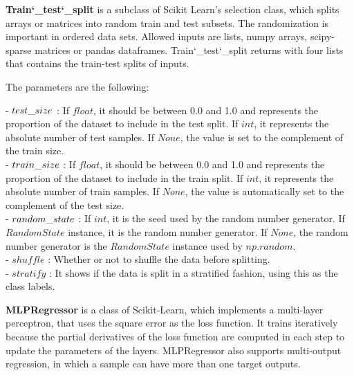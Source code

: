 \textbf{Train\char`_test\char`_split} is a subclass of Scikit Learn's selection class, which splits arrays or matrices into random train and test subsets. The randomization is important in ordered data sets. Allowed inputs are lists, numpy arrays, scipy-sparse matrices or pandas dataframes. Train\char`_test\char`_split returns with four lists that contains the train-test splits of inputs.\medskip

\noindent The parameters are the following:\smallskip

\noindent - $test\char`_size$ : If $float$, it should be between 0.0 and 1.0 and represents the proportion of the dataset to include in the test split. If $int$, it represents the absolute number of test samples. If $None$, the value is set to the complement of the train size. \\
- $train\char`_size$ : If $float$, it should be between 0.0 and 1.0 and represents the proportion of the dataset to include in the train split. If $int$, it represents the absolute number of train samples. If $None$, the value is automatically set to the complement of the test size.\\
- $random\char`_state$ : If $int$, it is the seed used by the random number generator. If $RandomState$ instance, it is the random number generator. If $None$, the random number generator is the $RandomState$ instance used by $np.random$.\\
- $shuffle$ : Whether or not to shuffle the data before splitting.\\
- $stratify$ : It shows if the data is split in a stratified fashion, using this as the class labels.\bigskip


\textbf{MLPRegressor} \cite{bengfort2018applied} is a class of Scikit-Learn, which implements a multi-layer perceptron, that uses the square error as the loss function. It trains iteratively because the partial derivatives of the loss function are computed in each step to update the parameters of the layers. MLPRegressor also supports multi-output regression, in which a sample can have more than one target outputs.\medskip

